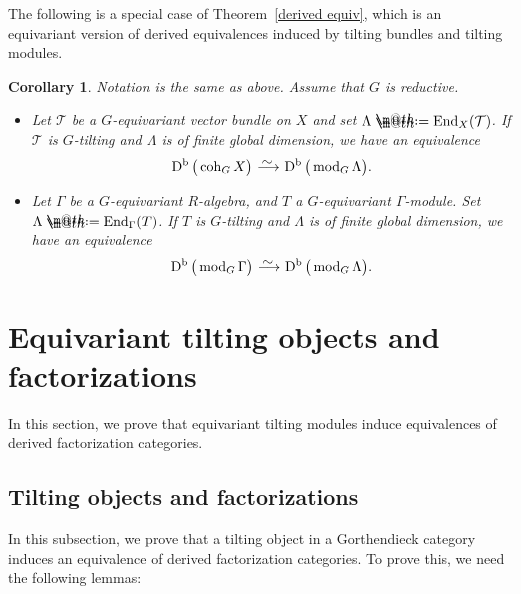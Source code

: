 \documentclass[pdftex]{sigma}%
\makeatletter
\newtheorem{cor}[dfn]{Corollary}
\newcommand*{\defeq}{\mathrel{\rlap{%
 \raisebox{0.3ex}{$\m@th\cdot$}}%
 \raisebox{-0.3ex}{$\m@th\cdot$}}%
 =}
\numberwithin{equation}{section}
\newcommand{\End}{\operatorname{End}}
\newcommand{\coh}{\operatorname{coh}}
\newcommand{\fmod}{\operatorname{mod}}
\newcommand{\Db}{\operatorname{D^b}}
\newcommand{\cT}{\mathcal{T}}
\newcommand{\simto}{\,\,\,\,\raisebox{4pt}{$\sim$}{\kern -1.1em \longrightarrow}\,}
\makeatother
\begin{document}
 The following is a special case of Theorem~\ref{derived equiv}, which is an equivariant version of derived equivalences induced by tilting bundles and tilting modules.

 \begin{cor} Notation is the same as above. Assume that $G$ is reductive.
 \begin{itemize}\itemsep=0pt
 \item[$1.$] Let $\cT$ be a $G$-equivariant vector bundle on $X$ and set $\Lambda\defeq\End_X(\cT)$. If $\cT$ is $G$-tilting and $\Lambda$ is of finite global dimension, we have an equivalence
 \begin{gather*}
 \Db\big(\coh_GX\big)\simto \Db\big(\fmod_G\Lambda\big).
 \end{gather*}
 \item[$2.$] Let $\Gamma$ be a $G$-equivariant $R$-algebra, and $T$ a $G$-equivariant $\Gamma$-module. Set $\Lambda\defeq\End_{\Gamma}(T)$. If $T$ is $G$-tilting and $\Lambda$ is of finite global dimension, we have an equivalence
 \begin{gather*}
 \Db\big(\fmod_G\Gamma\big)\simto \Db\big(\fmod_G\Lambda\big).
 \end{gather*}
 \end{itemize}
\end{cor}




















\section{Equivariant tilting objects and factorizations}

In this section, we prove that equivariant tilting modules induce equivalences of derived factorization categories.

\subsection{Tilting objects and factorizations}\label{general morita}
In this subsection, we prove that a tilting object in a Gorthendieck category induces an equivalence of derived factorization categories. To prove this, we need the following lemmas:
\end{document}
